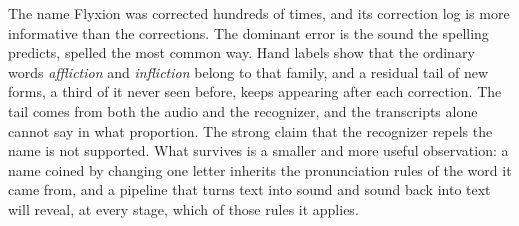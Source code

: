 \documentclass[11pt]{article}
\begin{document}
The name Flyxion was corrected hundreds of times, and its correction log is more informative than the corrections. The dominant error is the sound the spelling predicts, spelled the most common way. Hand labels show that the ordinary words \emph{affliction} and \emph{infliction} belong to that family, and a residual tail of new forms, a third of it never seen before, keeps appearing after each correction. The tail comes from both the audio and the recognizer, and the transcripts alone cannot say in what proportion. The strong claim that the recognizer repels the name is not supported. What survives is a smaller and more useful observation: a name coined by changing one letter inherits the pronunciation rules of the word it came from, and a pipeline that turns text into sound and sound back into text will reveal, at every stage, which of those rules it applies.
\end{document}
